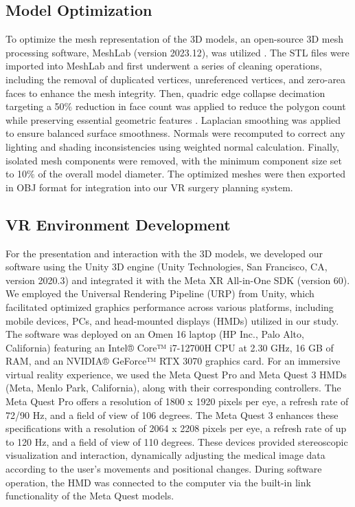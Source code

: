 \documentclass[sn-mathphys-num]{sn-jnl}%
\theoremstyle{thmstyleone}%
\theoremstyle{thmstyletwo}%
\theoremstyle{thmstylethree}%
\begin{document}
\subsection{Model Optimization}
To optimize the mesh representation of the 3D models, an open-source 3D mesh processing software, MeshLab (version 2023.12), was utilized \cite{RN19}. The STL files were imported into MeshLab and first underwent a series of cleaning operations, including the removal of duplicated vertices, unreferenced vertices, and zero-area faces to enhance the mesh integrity. Then, quadric edge collapse decimation targeting a 50$\%$ reduction in face count was applied to reduce the polygon count while preserving essential geometric features \cite{RN20}. Laplacian smoothing was applied to ensure balanced surface smoothness. Normals were recomputed to correct any lighting and shading inconsistencies using weighted normal calculation. Finally, isolated mesh components were removed, with the minimum component size set to 10$\%$ of the overall model diameter. The optimized meshes were then exported in OBJ format for integration into our VR surgery planning system.
\subsection{VR Environment Development}
For the presentation and interaction with the 3D models, we developed our software using the Unity 3D engine (Unity Technologies, San Francisco, CA, version 2020.3) and integrated it with the Meta XR All-in-One SDK (version 60). We employed the Universal Rendering Pipeline (URP) from Unity, which facilitated optimized graphics performance across various platforms, including mobile devices, PCs, and head-mounted displays (HMDs) utilized in our study.
The software was deployed on an Omen 16 laptop (HP Inc., Palo Alto, California) featuring an Intel® Core™ i7-12700H CPU at 2.30 GHz, 16 GB of RAM, and an NVIDIA® GeForce™ RTX 3070 graphics card. For an immersive virtual reality experience, we used the Meta Quest Pro and Meta Quest 3 HMDs (Meta, Menlo Park, California), along with their corresponding controllers. The Meta Quest Pro offers a resolution of 1800 x 1920 pixels per eye, a refresh rate of 72/90 Hz, and a field of view of 106 degrees. The Meta Quest 3 enhances these specifications with a resolution of 2064 x 2208 pixels per eye, a refresh rate of up to 120 Hz, and a field of view of 110 degrees. These devices provided stereoscopic visualization and interaction, dynamically adjusting the medical image data according to the user's movements and positional changes. During software operation, the HMD was connected to the computer via the built-in link functionality of the Meta Quest models.
\end{document}
